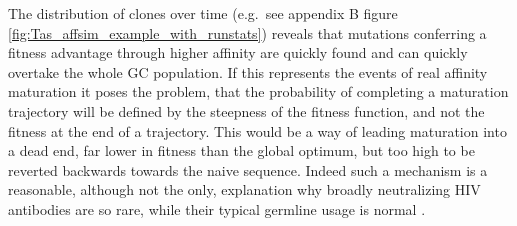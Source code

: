 

The distribution of clones over time (e.g.\ see appendix B figure \ref{fig:Tas_affsim_example_with_runstats}) reveals that mutations conferring a fitness advantage through higher affinity are quickly found and can quickly overtake the whole GC population.
If this represents the events of real affinity maturation it poses the problem, that the probability of completing a maturation trajectory will be defined by the steepness of the fitness function, and not the fitness at the end of a trajectory.
This would be a way of leading maturation into a dead end, far lower in fitness than the global optimum, but too high to be reverted backwards towards the naive sequence.
Indeed such a mechanism is a reasonable, although not the only, explanation why broadly neutralizing HIV antibodies are so rare, while their typical germline usage is normal \cite{scheepers2015ability}.

